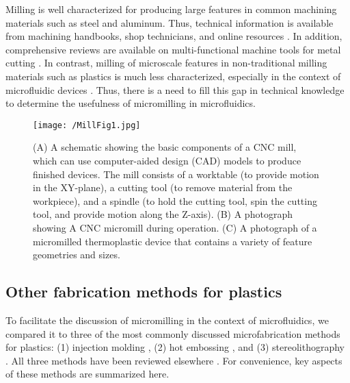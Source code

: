 Milling is well characterized for producing large features in common machining materials such as steel and aluminum. Thus, technical information is available from machining handbooks, shop technicians, and online resources \cite{Chi-Hsiang2013}. In addition, comprehensive reviews are available on multi-functional machine tools for metal cutting \cite{Moriwaki2008}. In contrast, milling of microscale features in non-traditional milling materials such as plastics is much less characterized, especially in the context of microfluidic devices \cite{Chen2014}. Thus, there is a need to fill this gap in technical knowledge to determine the usefulness of micromilling in microfluidics.

\begin{figure}[ht] %
\centering
\texttt{[image: /MillFig1.jpg]}
\caption[\textbf{Milling overview}]{(A) A schematic showing the basic components of a CNC mill, which can use computer-aided design (CAD) models to produce finished devices. The mill consists of a worktable (to provide motion in the XY-plane), a cutting tool (to remove material from the workpiece), and a spindle (to hold the cutting tool, spin the cutting tool, and provide motion along the Z-axis). (B) A photograph showing A CNC micromill during operation. (C) A photograph of a micromilled thermoplastic device that contains a variety of feature geometries and sizes.}
\label{figure:MillFig1}
\end{figure}

\subsection{Other fabrication methods for plastics}
To facilitate the discussion of micromilling in the context of microfluidics, we compared it to three of the most commonly discussed microfabrication methods for plastics: (1) injection molding \cite{Attia2009, Tanzi2013}, (2) hot embossing \cite{Becker2000a, Abgrall2007}, and (3) stereolithography \cite{Waldbaur2011, Au2014}. All three methods have been reviewed elsewhere \cite{Melchels2010}. For convenience, key aspects of these methods are summarized here.

